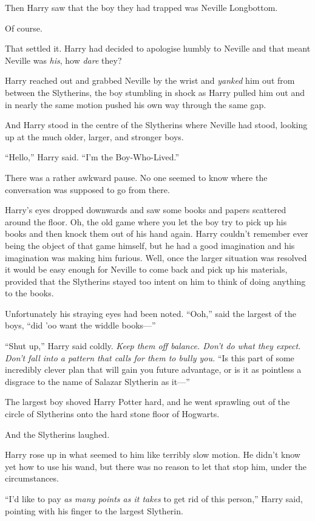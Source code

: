 Then Harry saw that the boy they had trapped was Neville Longbottom.

Of course.

That settled it. Harry had decided to apologise humbly to Neville and that meant Neville was \emph{his}, how \emph{dare} they?

Harry reached out and grabbed Neville by the wrist and \emph{yanked} him out from between the Slytherins, the boy stumbling in shock as Harry pulled him out and in nearly the same motion pushed his own way through the same gap.

And Harry stood in the centre of the Slytherins where Neville had stood, looking up at the much older, larger, and stronger boys.

“Hello,” Harry said. “I’m the Boy-Who-Lived.”

There was a rather awkward pause. No one seemed to know where the conversation was supposed to go from there.

Harry’s eyes dropped downwards and saw some books and papers scattered around the floor. Oh, the old game where you let the boy try to pick up his books and then knock them out of his hand again. Harry couldn’t remember ever being the object of that game himself, but he had a good imagination and his imagination was making him furious. Well, once the larger situation was resolved it would be easy enough for Neville to come back and pick up his materials, provided that the Slytherins stayed too intent on him to think of doing anything to the books.

Unfortunately his straying eyes had been noted. “Ooh,” said the largest of the boys, “did ’oo want the widdle books—”

“Shut up,” Harry said coldly. \emph{Keep them off balance. Don’t do what they expect. Don’t fall into a pattern that calls for them to bully you.} “Is this part of some incredibly clever plan that will gain you future advantage, or is it as pointless a disgrace to the name of Salazar Slytherin as it—”

The largest boy shoved Harry Potter hard, and he went sprawling out of the circle of Slytherins onto the hard stone floor of Hogwarts.

And the Slytherins laughed.

Harry rose up in what seemed to him like terribly slow motion. He didn’t know yet how to use his wand, but there was no reason to let that stop him, under the circumstances.

“I’d like to pay \emph{as many points as it takes} to get rid of this person,” Harry said, pointing with his finger to the largest Slytherin.


